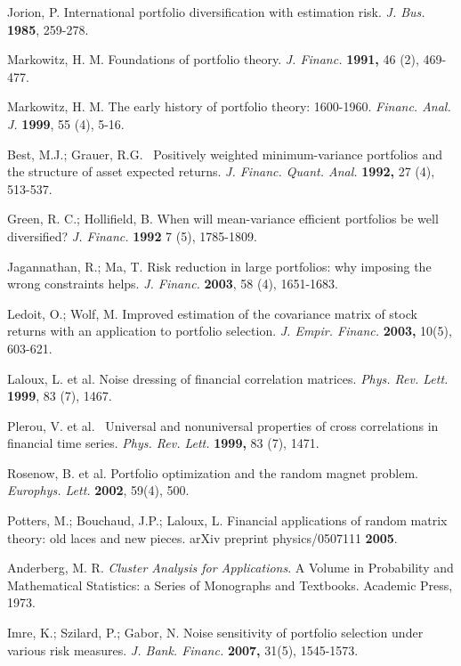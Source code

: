 \documentclass[ aip,jmp,reprint]{revtex4-2}
\begin{document}
\begin{thebibliography}{99}
 Jorion, P. International portfolio diversification with
estimation risk. \textit{J. Bus.} \textbf{1985}, 259-278.

 Markowitz, H. M. Foundations of portfolio theory. \textit{J.
Financ. }\textbf{1991, }46 (2), 469-477.

 Markowitz, H. M. The early history of portfolio theory:
1600-1960. \textit{Financ. Anal. J. }\textbf{1999}, 55 (4), 5-16.

 Best, M.J.; Grauer, R.G. \ Positively weighted
minimum-variance portfolios and the structure of asset expected returns. 
\textit{J. Financ. Quant. Anal.}  \textbf{1992, }27 (4), 513-537.

 Green, R. C.; Hollifield, B. When will mean-variance
efficient portfolios be well diversified? \textit{J. Financ. }\textbf{1992 }%
7 (5), 1785-1809.

 Jagannathan, R.; Ma, T. Risk reduction in large
portfolios: why imposing the wrong constraints helps. \textit{J. Financ. }%
\textbf{2003}, 58 (4), 1651-1683.

 Ledoit, O.; Wolf, M.  Improved estimation of the covariance
matrix of stock returns with an application to portfolio selection. \textit{%
J. Empir. Financ. }\textbf{2003, }10(5), 603-621.

 Laloux, L. et al. Noise dressing of financial correlation
matrices. \textit{Phys. Rev. Lett. }\textbf{1999}, 83 (7), 1467.

 Plerou, V. et al. \ Universal and nonuniversal properties
of cross correlations in financial time series. \textit{Phys. Rev. Lett. }%
\textbf{1999, }83 (7), 1471.

 Rosenow, B. et al. Portfolio optimization and the random
magnet problem. \textit{Europhys. Lett. }\textbf{2002}, 59(4), 500.

 Potters, M.; Bouchaud, J.P.; Laloux, L.  Financial
applications of random matrix theory: old laces and new pieces. arXiv
preprint physics/0507111 \textbf{2005}.

 Anderberg, M. R. \textit{Cluster Analysis for
Applications}. A Volume in Probability and Mathematical Statistics: a Series
of Monographs and Textbooks. Academic Press, 1973.

 Imre, K.; Szilard, P.; Gabor, N. Noise sensitivity of
portfolio selection under various risk measures. \textit{J. Bank. Financ. }%
\textbf{2007, } 31(5), 1545-1573.


\end{thebibliography}
\end{document}
